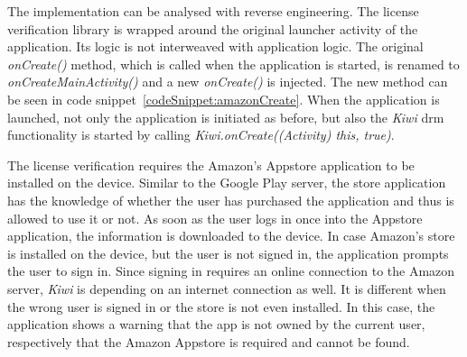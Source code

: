 The implementation can be analysed with reverse engineering.
The license verification library is wrapped around the original launcher activity of the application.
Its logic is not interweaved with application logic.
The original \textit{onCreate()} method, which is called when the application is started, is renamed to \textit{onCreateMainActivity()} and a new \textit{onCreate()} is injected.
The new method can be seen in code snippet~\ref{codeSnippet:amazonCreate}.
When the application is launched, not only the application is initiated as before, but also the \textit{Kiwi} \gls{drm} functionality is started by calling \textit{Kiwi.onCreate((Activity) this, true)}.
\newline

The license verification requires the Amazon's Appstore application to be installed on the device.
Similar to the Google Play server, the store application has the knowledge of whether the user has purchased the application and thus is allowed to use it or not.
As soon as the user logs in once into the Appstore application, the information is downloaded to the device.
In case Amazon's store is installed on the device, but the user is not signed in, the application prompts the user to sign in.
Since signing in requires an online connection to the Amazon server, \textit{Kiwi} is depending on an internet connection as well.
It is different when the wrong user is signed in or the store is not even installed.
In this case, the application shows a warning that the app is not owned by the current user, respectively that the Amazon Appstore is required and cannot be found.
